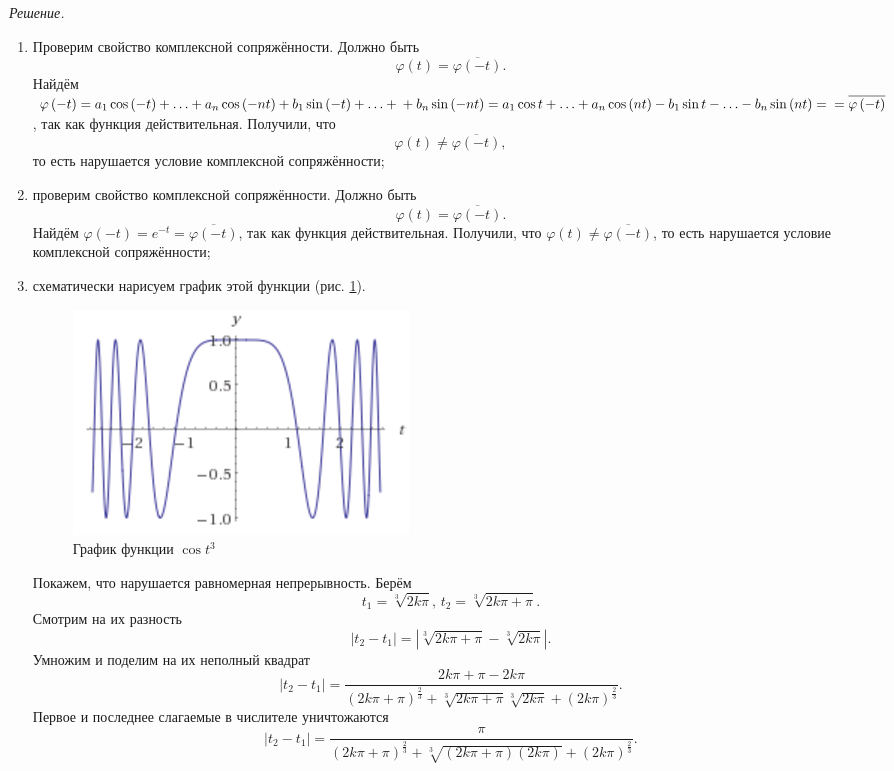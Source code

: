 \textit{Решение.}
\begin{enumerate}[label=\alph*)]
\item Проверим свойство комплексной сопряжённости.
Должно быть
$$ \varphi \left( t \right) =
\overline{ \varphi \left( - t \right) }.$$
Найдём
$ \varphi \left( - t \right) =
a_1 \cos \left( - t \right) + \dotsc + a_n \cos \left( - nt \right) + b_1 \sin \left( - t \right) + \dotsc + \\
+ b_n \sin \left( - nt \right) =
a_1 \cos t + \dotsc + a_n \cos \left( nt \right) - b_1 \sin t - \dotsc - b_n \sin \left( nt \right) = \\
= \overline{ \varphi \left( - t \right) }$,
так как функция действительная.
Получили, что
$$ \varphi \left( t \right) \neq
\overline{ \varphi \left( - t \right) },$$
то есть нарушается условие комплексной сопряжённости;
\item проверим свойство комплексной сопряжённости.
Должно быть
$$ \varphi \left( t \right) =
\overline{ \varphi \left( - t \right) }.$$
Найдём $ \varphi \left( - t \right) = e^{-t} = \overline{ \varphi \left( - t \right) }$, так как функция действительная.
Получили, что $ \varphi \left( t \right) \neq \overline{ \varphi \left( - t \right) }$, то есть нарушается условие комплексной сопряжённости;
\item схематически нарисуем график этой функции (рис. \ref{fig:1519}).

\begin{figure}[h!]
  \centering
  \includegraphics[width=.4\textwidth]{./pictures/15_19.png}
  \caption{График функции $ \cos t^3$}
  \label{fig:1519}
\end{figure}

Покажем, что нарушается равномерная непрерывность.
Берём
$$t_1 = \sqrt[3]{2k \pi }, \,
t_2 = \sqrt[3]{2k \pi + \pi }.$$
Смотрим на их разность
$$ \left| t_2 - t_1 \right| =
\left| \sqrt[3]{2k \pi + \pi } - \sqrt[3]{2k \pi } \right|.$$
Умножим и поделим на их неполный квадрат
$$ \left| t_2 - t_1 \right| =
\frac{2k \pi + \pi - 2k \pi}{ \left( 2k \pi + \pi \right)^{ \frac{2}{3}} + \sqrt[3]{2k \pi + \pi } \sqrt[3]{2k \pi } + \left( 2k \pi \right)^{ \frac{2}{3}}}.$$
Первое и последнее слагаемые в числителе уничтожаются
$$ \left| t_2 - t_1 \right| =
\frac{ \pi }{ \left( 2k \pi + \pi \right)^{ \frac{2}{3}} + \sqrt[3]{ \left( 2k \pi + \pi \right) \left( 2k \pi \right) } + \left( 2k \pi \right)^{ \frac{2}{3}}}.$$


\end{enumerate}
